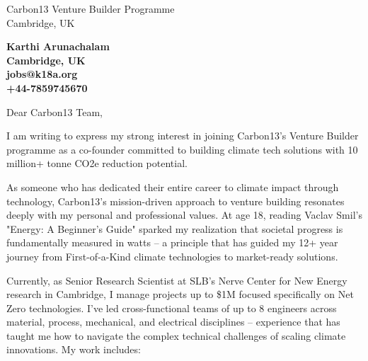 \documentclass[12pt]{letter} %
\begin{document}

\date{\raggedleft\today} %

\begin{letter}{
	Carbon13 Venture Builder Programme \\
	Cambridge, UK
}


\begin{center}
\color{primarycolor}
\textbf{Karthi Arunachalam \\ 
Cambridge, UK \\
jobs@k18a.org \\
+44-7859745670}
\end{center}

\vspace{1cm} %

\signature{Karthi Arunachalam} %


\opening{Dear Carbon13 Team,}

I am writing to express my strong interest in joining Carbon13's Venture Builder programme as a co-founder committed to building climate tech solutions with 10 million+ tonne CO2e reduction potential.

As someone who has dedicated their entire career to climate impact through technology, Carbon13's mission-driven approach to venture building resonates deeply with my personal and professional values. At age 18, reading Vaclav Smil's "Energy: A Beginner's Guide" sparked my realization that societal progress is fundamentally measured in watts – a principle that has guided my 12+ year journey from First-of-a-Kind climate technologies to market-ready solutions.

Currently, as Senior Research Scientist at SLB's Nerve Center for New Energy research in Cambridge, I manage projects up to \$1M focused specifically on Net Zero technologies. I've led cross-functional teams of up to 8 engineers across material, process, mechanical, and electrical disciplines – experience that has taught me how to navigate the complex technical challenges of scaling climate innovations. My work includes:


\end{letter}
\end{document}
